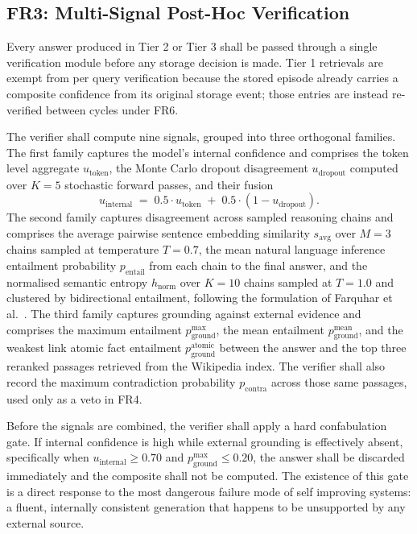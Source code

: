 \subsection{FR3: Multi-Signal Post-Hoc Verification}
\label{sec:fr3}

Every answer produced in Tier 2 or Tier 3 shall be passed through a single verification module before any storage decision is made. Tier 1 retrievals are exempt from per query verification because the stored episode already carries a composite confidence from its original storage event; those entries are instead re-verified between cycles under FR6.

The verifier shall compute nine signals, grouped into three orthogonal families. The first family captures the model's internal confidence and comprises the token level aggregate $u_{\text{token}}$, the Monte Carlo dropout disagreement $u_{\text{dropout}}$ computed over $K = 5$ stochastic forward passes, and their fusion
\begin{equation}
u_{\text{internal}} \;=\; 0.5 \cdot u_{\text{token}} \;+\; 0.5 \cdot (1 - u_{\text{dropout}}).
\label{eq:u-internal}
\end{equation}
The second family captures disagreement across sampled reasoning chains and comprises the average pairwise sentence embedding similarity $s_{\text{avg}}$ over $M = 3$ chains sampled at temperature $T = 0.7$, the mean natural language inference entailment probability $p_{\text{entail}}$ from each chain to the final answer, and the normalised semantic entropy $h_{\text{norm}}$ over $K = 10$ chains sampled at $T = 1.0$ and clustered by bidirectional entailment, following the formulation of Farquhar et al.\ \cite{farquhar2024semantic}. The third family captures grounding against external evidence and comprises the maximum entailment $p_{\text{ground}}^{\text{max}}$, the mean entailment $p_{\text{ground}}^{\text{mean}}$, and the weakest link atomic fact entailment $p_{\text{ground}}^{\text{atomic}}$ between the answer and the top three reranked passages retrieved from the Wikipedia index. The verifier shall also record the maximum contradiction probability $p_{\text{contra}}$ across those same passages, used only as a veto in FR4.

Before the signals are combined, the verifier shall apply a hard confabulation gate. If internal confidence is high while external grounding is effectively absent, specifically when $u_{\text{internal}} \geq 0.70$ and $p_{\text{ground}}^{\text{max}} \leq 0.20$, the answer shall be discarded immediately and the composite shall not be computed. The existence of this gate is a direct response to the most dangerous failure mode of self improving systems: a fluent, internally consistent generation that happens to be unsupported by any external source.

